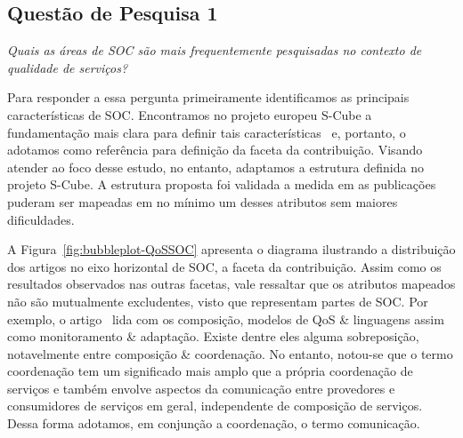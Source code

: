 \subsection{Quest\~{a}o de Pesquisa 1}
\emph{Quais as áreas de SOC são mais frequentemente pesquisadas no contexto de qualidade de serviços?}


Para responder a essa pergunta primeiramente identificamos as principais caracter\'{i}sticas de SOC. Encontramos no projeto europeu S-Cube a fundamenta\c{c}\~{a}o mais clara para definir tais caracter\'{i}sticas~\cite{SCube-FINALREPORT} e, portanto, o adotamos como refer\^{e}ncia para definição da faceta da contribui\c{c}\~{a}o. Visando atender ao foco desse estudo, no entanto, adaptamos a estrutura definida no projeto S-Cube. A estrutura proposta foi validada a medida em as publicações puderam ser mapeadas em no mínimo um desses atributos sem maiores dificuldades.


A Figura~\ref{fig:bubbleplot-QoSSOC} apresenta o diagrama ilustrando a distribui\c{c}\~{a}o dos artigos no eixo horizontal de SOC, a faceta da contribui\c{c}\~{a}o. Assim como os resultados observados nas outras facetas, vale ressaltar que os atributos mapeados não são mutualmente excludentes, visto que representam partes de SOC. Por exemplo, o artigo~\cite{DBLP:conf/dsn/ZhengL09} lida com os composi\c{c}\~{a}o, modelos de QoS \& linguagens assim como monitoramento \& adapta\c{c}\~{a}o. Existe dentre eles alguma sobreposição, notavelmente entre composição \& coordenação. No entanto, notou-se que o termo coordenação tem um significado mais amplo que a própria coordenação de serviços e também envolve aspectos da comunicação entre provedores e consumidores de serviços em geral, independente de composição de serviços. Dessa forma adotamos, em conjunção a coordenação, o termo comunicação.

